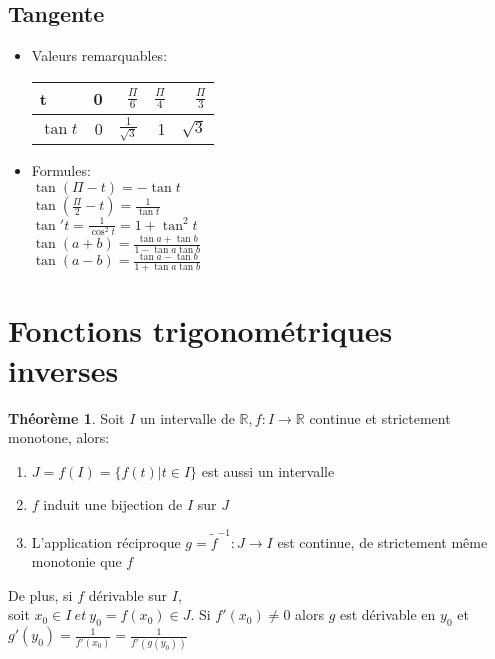 \documentclass[fleqn]{article}
\theoremstyle{definition} \newtheorem*{defi}{D\'efinition}
\theoremstyle{definition} \newtheorem*{theo}{Th\'eor\`eme}
\begin{document}
\subsection{Tangente}
\begin{itemize}
	\item Valeurs remarquables: \\
	\begin{tabular}{lrrrr}
		\toprule
		t        & 0 & $\frac{\Pi}{6}$      & $\frac{\Pi}{4}$ & $\frac{\Pi}{3}$ \\
		\hline
		$\tan t$ & 0 & $\frac{1}{\sqrt{3}}$ & 1               & $\sqrt{3}$ \\
		\bottomrule
	\end{tabular}

	\item Formules: \\
	$\tan (\Pi-t) = -\tan t$ \\
	$\tan (\frac{\Pi}{2} - t) = \frac{1}{\tan t} $ \\
	\newline
	$\tan' t = \frac{1}{\cos^2 t} = 1 + \tan^2 t$ \\
	$\tan (a+b) = \frac{\tan a + \tan b}{1 - \tan a\tan b}$ \\
	$\tan (a-b) = \frac{\tan a - \tan b}{1 + \tan a\tan b}$ \\
\end{itemize}

\section{Fonctions trigonom\'etriques inverses}
\begin{theo}
	Soit \(I\) un intervalle de \(\mathbb{R}, f: I \rightarrow \mathbb{R}\) continue et strictement monotone, alors:
	\begin{enumerate}
		\item \(J = f(I) = \{f(t)|t \in I\}\) est aussi un intervalle
		\item \(f\) induit une bijection de \(I\) sur \(J\)
		\item L'application r\'eciproque \(g = \tilde{f}^{-1}:J \rightarrow I\) est continue, de strictement m\^eme monotonie que \(f\)
	\end{enumerate}
\end{theo}
De plus, si \(f\) d\'erivable sur \(I\), \\
soit \(x_0 \in I\ et\ y_0 = f(x_0) \in J\). Si \(f'(x_0) \neq 0 \) alors \(g\) est d\'erivable en \(y_0\) et
\(g'(y_0) = \frac{1}{f'(x_0)} = \frac{1}{f'(g(y_0))}\) \\
\end{document}
